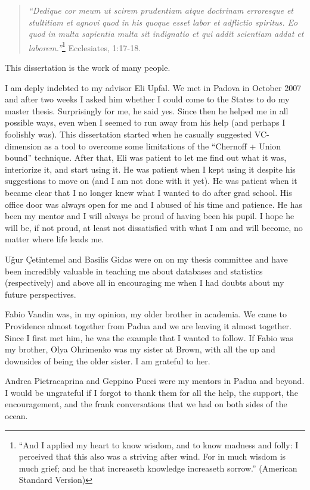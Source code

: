 \begin{quote}
  {\em ``Dedique cor meum ut scirem prudentiam atque doctrinam erroresque et
  stultitiam et agnovi quod in his quoque esset labor et adflictio spiritus. Eo
  quod in multa sapientia multa sit indignatio et qui addit scientiam addat et
  laborem.''}\footnote{``And I applied my heart to know wisdom, and to know madness
  and folly: I perceived that this also was a striving after wind. For in much
  wisdom is much grief; and he that increaseth knowledge increaseth sorrow.'' 
  (American Standard Version)} Ecclesiates, 1:17-18.
\end{quote}

This dissertation is the work of many people.

I am deply indebted to my advisor Eli Upfal. We met in Padova in October 2007
and after two weeks I asked him whether I could come to the States to do my
master thesis. Surprisingly for me, he said yes. Since then he helped me in all
possible ways, even when I seemed to run away from his help (and perhaps I
foolishly was). This dissertation started when he casually suggested
VC-dimension as a tool to overcome some limitations of the ``Chernoff + Union
bound'' technique. After that, Eli was patient to let me find out what it was,
interiorize it, and start using it. He was patient when I kept using it despite
his suggestions to move on (and I am not done with it yet). He was patient when
it became clear that I no longer knew what I wanted to do after grad school. His
office door was always open for me and I abused of his time and patience. He has
been my mentor and I will always be proud of having been his pupil. I hope he
will be, if not proud, at least not dissatisfied with what I am and will become,
no matter where life leads me.  

U\v{g}ur \c{C}etintemel and Basilis Gidas were on on my thesis committee and have
been incredibly valuable in teaching me about databases and statistics
(respectively) and above all in encouraging me when I had doubts about my future
perspectives.

Fabio Vandin was, in my opinion, my older brother in academia. We came to
Providence almost together from Padua and we are leaving it almost together.
Since I first met him, he was the example that I wanted to follow. If Fabio was
my brother, Olya Ohrimenko was my sister at Brown, with all the up and downsides
of being the older sister. I am grateful to her.

Andrea Pietracaprina and Geppino Pucci were my mentors in Padua and beyond. I
would be ungrateful if I forgot to thank them for all the help, the support, the
encouragement, and the frank conversations that we had on both sides of the
ocean.

